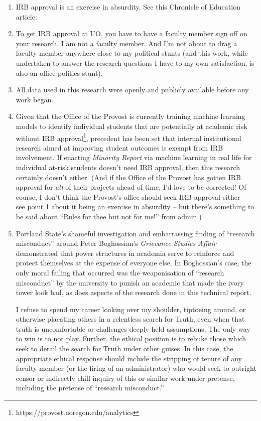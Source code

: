 \documentclass[10]{article}
\begin{document}
\begin{enumerate}
	\item IRB approval is an exercise in absurdity. See this Chronicle of Education article:
	\item To get IRB approval at UO, you have to have a faculty member sign off on your research. I am not a faculty member. And I'm not about to drag a faculty member anywhere close to my political stunts (and this work, while undertaken to answer the research questions I have to my own satisfaction, is also an office politics stunt).
	\item All data used in this research were openly and publicly available before any work began.
	\item Given that the Office of the Provost is currently training machine learning models to identify individual students that are potentially at academic risk without IRB approval\footnote{https://provost.uoregon.edu/analytics}, precedent has been set that internal institutional research aimed at improving student outcomes is exempt from IRB involvement. If enacting \textit{Minority Report} via machine learning in real life for individual at-risk students doesn't need IRB approval, then this research certainly doesn't either. (And if the Office of the Provost has gotten IRB approval for \textit{all} of their projects ahead of time, I'd love to be corrected! Of course, I don't think the Provost's office should seek IRB approval either -- see point 1 about it being an exercise in absurdity -- but there's something to be said about ``Rules for thee but not for me!'' from admin.)
	\item Portland State's shameful investigation and embarrassing finding of ``research misconduct'' around Peter Boghossian's \textit{Grievance Studies Affair} demonstrated that power structures in academia serve to reinforce and protect themselves at the expense of everyone else. In Boghossian's case, the only moral failing that occurred was the weaponisation of ``research misconduct'' by the university to punish an academic that made the ivory tower look bad, as does aspects of the research done in this technical report.
	
	I refuse to spend my career looking over my shoulder, tiptoeing around, or otherwise placating others in a relentless search for Truth, even when that truth is uncomfortable or challenges deeply held assumptions. The only way to win is to not play. Further, the ethical position is to rebuke those which seek to derail the search for Truth under other guises. In this case, the appropriate ethical response should include the stripping of tenure of any faculty member (or the firing of an administrator) who would seek to outright censor or indirectly chill inquiry of this or similar work under pretense, including the pretense of ``research misconduct.''
\end{enumerate}
\end{document}
